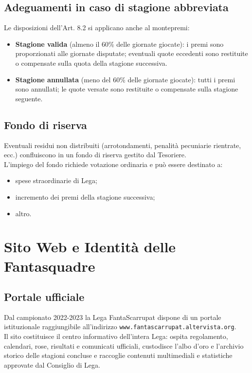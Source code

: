 \section{Adeguamenti in caso di stagione abbreviata}
\label{art:9.4}

\noindent
Le disposizioni dell’Art. 8.2 si applicano anche al montepremi:

\begin{itemize}
  \item \textbf{Stagione valida} (almeno il 60\% delle giornate giocate): i premi sono proporzionati alle giornate disputate; eventuali quote eccedenti sono restituite o compensate sulla quota della stagione successiva.
  \item \textbf{Stagione annullata} (meno del 60\% delle giornate giocate): tutti i premi sono annullati; le quote versate sono restituite o compensate sulla stagione seguente.
\end{itemize}

\section{Fondo di riserva}
\label{art:9.5}

Eventuali residui non distribuiti (arrotondamenti, penalità pecuniarie rientrate, ecc.) confluiscono in un fondo di riserva gestito dal Tesoriere.\\
L’impiego del fondo richiede votazione ordinaria e può essere destinato a:
\begin{itemize}
  \item spese straordinarie di Lega;
  \item incremento dei premi della stagione successiva;
  \item altro.
\end{itemize}



\chapter{Sito Web e Identità delle Fantasquadre}
\label{cap:sito-identita}

\section{Portale ufficiale}
\label{art:10.1}

Dal campionato 2022-2023 la Lega FantaScarrupat dispone di un portale istituzionale raggiungibile all’indirizzo \texttt{www.fantascarrupat.altervista.org}.\\
Il sito costituisce il centro informativo dell’intera Lega: ospita regolamento, calendari, rose, risultati e comunicati ufficiali, custodisce l’albo d’oro e l’archivio storico delle stagioni concluse e raccoglie contenuti multimediali e statistiche approvate dal Consiglio di Lega.

